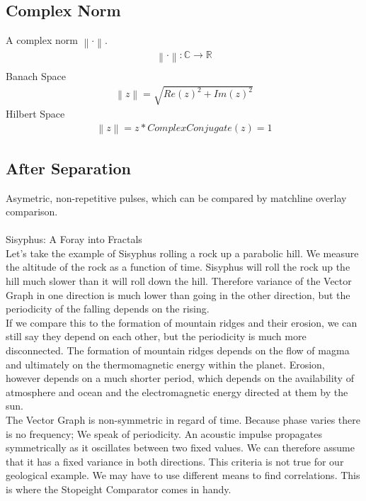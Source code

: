 \documentclass{report}
\newcommand\norm[1]{\left\lVert#1\right\rVert}
\begin{document}
\subsection*{Complex Norm}
A complex norm $\norm{\cdot}$.
\begin{align}
\norm{\cdot} : \mathbb{C} \rightarrow \mathbb{R}\\
\end{align}
Banach Space
\begin{align}
\norm{z} = \sqrt{Re(z)^2+Im(z)^2}
\end{align}
Hilbert Space
\begin{align}
\norm{z} = z*ComplexConjugate(z)=1
\end{align}

\subsection*{After Separation}
Asymetric, non-repetitive pulses, which can be compared by matchline overlay comparison.\\\\
Sisyphus: A Foray into Fractals\\
Let's take the example of Sisyphus rolling a rock up a parabolic hill. We measure the altitude of the rock as a function of time. Sisyphus will roll the rock up the hill much slower than it will roll down the hill. Therefore variance of the Vector Graph in one direction is much lower than going in the other direction, but the periodicity of the falling depends on the rising.\\
If we compare this to the formation of mountain ridges and their erosion, we can still say they depend on each other, but the periodicity is much more disconnected. The formation of mountain ridges depends on the flow of magma and ultimately on the thermomagnetic energy within the planet. Erosion, however depends on a much shorter period, which depends on the availability of atmosphere and ocean and the electromagnetic energy directed at them by the sun.\\
The Vector Graph is non-symmetric in regard of time. Because phase varies there is no frequency; We speak of periodicity. An acoustic impulse propagates symmetrically as it oscillates between two fixed values. We can therefore assume that it has a fixed variance in both directions. This criteria is not true for our geological example. We may have to use different means to find correlations. This is where the Stopeight Comparator comes in handy.\\


\iffalse
\printbibliography
\fi
{}

\end{document}

